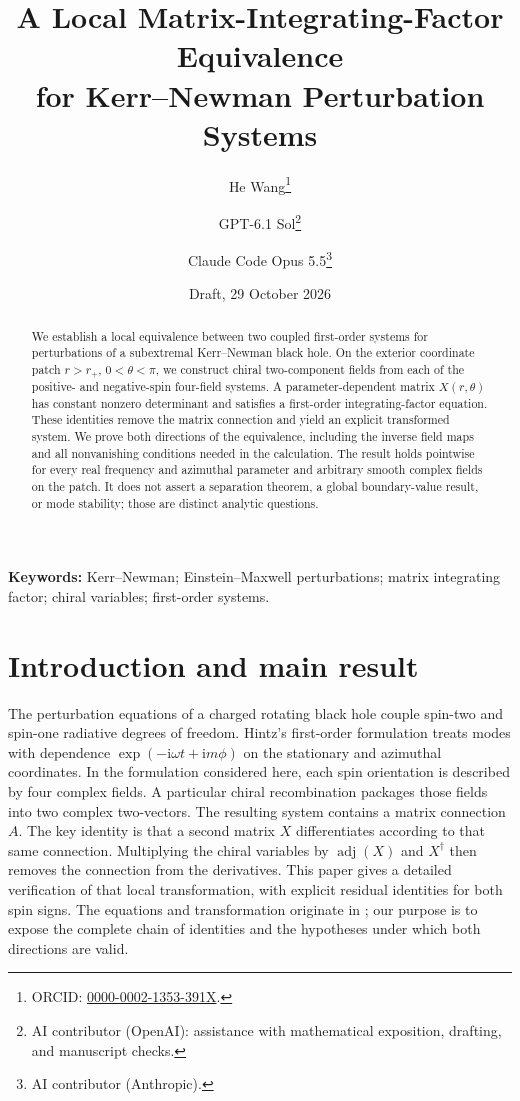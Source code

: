\documentclass[11pt,a4paper]{article}
\title{\textbf{A Local Matrix-Integrating-Factor Equivalence\\
for Kerr--Newman Perturbation Systems}}
\author{He Wang\thanks{ORCID: \href{https://orcid.org/0000-0002-1353-391X}{0000-0002-1353-391X}.}
\and GPT-6.1 Sol\thanks{AI contributor (OpenAI): assistance with mathematical exposition, drafting, and manuscript checks.}
\and Claude Code Opus 5.5\thanks{AI contributor (Anthropic).}}
\date{Draft, 29 October 2026}
\numberwithin{equation}{section}
\theoremstyle{definition}
\theoremstyle{remark}
\newcommand{\I}{\mathrm i}
\newcommand{\adj}{\operatorname{adj}}
\begin{document}
\maketitle

\begin{abstract}
We establish a local equivalence between two coupled first-order systems
for perturbations of a subextremal Kerr--Newman black hole.  On the exterior
coordinate patch \(r>r_+\), \(0<\theta<\pi\), we construct chiral
two-component fields from each of the positive- and negative-spin
four-field systems.  A parameter-dependent matrix \(X(r,\theta)\) has
constant nonzero determinant and satisfies a first-order integrating-factor
equation.  These identities remove the matrix connection and yield an
explicit transformed system.  We prove both directions of the equivalence,
including the inverse field maps and all nonvanishing conditions needed in
the calculation.  The result holds pointwise for every real frequency and
azimuthal parameter and arbitrary smooth complex fields on the patch.  It
does not assert a separation theorem, a global boundary-value result, or
mode stability; those are distinct analytic questions.
\end{abstract}

\noindent\textbf{Keywords:} Kerr--Newman; Einstein--Maxwell perturbations;
matrix integrating factor; chiral variables; first-order systems.

\section{Introduction and main result}

The perturbation equations of a charged rotating black hole couple
spin-two and spin-one radiative degrees of freedom.  Hintz's
first-order formulation \cite{Hintz2026} treats modes with dependence
\(\exp(-\I\omega t+\I m\phi)\) on the stationary and azimuthal coordinates.
In the formulation considered here, each spin orientation is described by four complex
fields.  A particular chiral recombination packages those fields into two
complex two-vectors.  The resulting system contains a matrix connection
\(A\).  The key identity is that a second matrix \(X\) differentiates
according to that same connection.  Multiplying the chiral variables by
\(\adj(X)\) and \(X^\dagger\) then removes the connection from the
derivatives.  This paper gives a detailed verification of that local
transformation, with explicit residual identities for both spin signs.
The equations and transformation originate in \cite{Hintz2026}; our
purpose is to expose the complete chain of identities and the hypotheses
under which both directions are valid.
\end{document}
